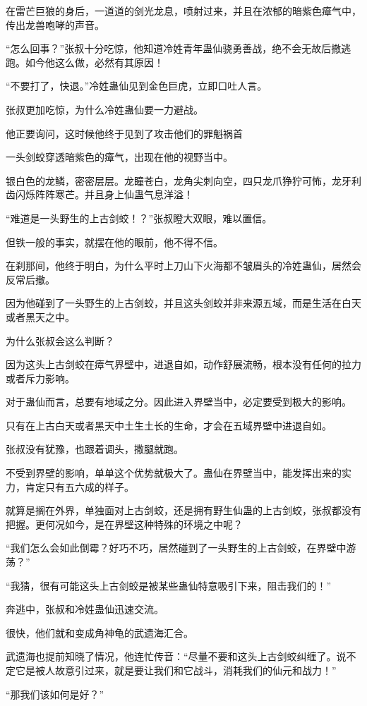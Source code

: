 \begin{this_body}
在雷芒巨狼的身后，一道道的剑光龙息，喷射过来，并且在浓郁的暗紫色瘴气中，传出龙兽咆哮的声音。

“怎么回事？”张叔十分吃惊，他知道冷姓青年蛊仙骁勇善战，绝不会无故后撤逃跑。如今他这么做，必然有其原因！

“不要打了，快退。”冷姓蛊仙见到金色巨虎，立即口吐人言。

张叔更加吃惊，为什么冷姓蛊仙要一力避战。

他正要询问，这时候他终于见到了攻击他们的罪魁祸首

一头剑蛟穿透暗紫色的瘴气，出现在他的视野当中。

银白色的龙鳞，密密层层。龙瞳苍白，龙角尖刺向空，四只龙爪狰狞可怖，龙牙利齿闪烁阵阵寒芒。并且身上仙蛊气息洋溢！

“难道是一头野生的上古剑蛟！？”张叔瞪大双眼，难以置信。

但铁一般的事实，就摆在他的眼前，他不得不信。

在刹那间，他终于明白，为什么平时上刀山下火海都不皱眉头的冷姓蛊仙，居然会反常后撤。

因为他碰到了一头野生的上古剑蛟，并且这头剑蛟并非来源五域，而是生活在白天或者黑天之中。

为什么张叔会这么判断？

因为这头上古剑蛟在瘴气界壁中，进退自如，动作舒展流畅，根本没有任何的拉力或者斥力影响。

对于蛊仙而言，总要有地域之分。因此进入界壁当中，必定要受到极大的影响。

只有在上古白天或者黑天中土生土长的生命，才会在五域界壁中进退自如。

张叔没有犹豫，也跟着调头，撒腿就跑。

不受到界壁的影响，单单这个优势就极大了。蛊仙在界壁当中，能发挥出来的实力，肯定只有五六成的样子。

就算是搁在外界，单独面对上古剑蛟，还是拥有野生仙蛊的上古剑蛟，张叔都没有把握。更何况如今，是在界壁这种特殊的环境之中呢？

“我们怎么会如此倒霉？好巧不巧，居然碰到了一头野生的上古剑蛟，在界壁中游荡？”

“我猜，很有可能这头上古剑蛟是被某些蛊仙特意吸引下来，阻击我们的！”

奔逃中，张叔和冷姓蛊仙迅速交流。

很快，他们就和变成角神龟的武遗海汇合。

武遗海也提前知晓了情况，他连忙传音：“尽量不要和这头上古剑蛟纠缠了。说不定它是被人故意引过来，就是要让我们和它战斗，消耗我们的仙元和战力！”

“那我们该如何是好？”


\end{this_body}

